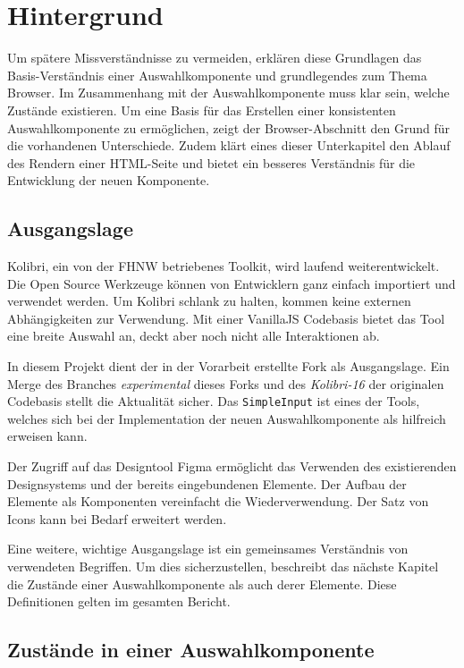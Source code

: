 \chapter{Hintergrund}
\label{chap:background}

Um spätere Missverständnisse zu vermeiden, erklären diese Grundlagen das Basis-Verständnis einer Auswahlkomponente und grundlegendes zum Thema Browser.
Im Zusammenhang mit der Auswahlkomponente muss klar sein, welche Zustände existieren.
Um eine Basis für das Erstellen einer konsistenten Auswahlkomponente zu ermöglichen, zeigt der Browser-Abschnitt den Grund für die vorhandenen Unterschiede.
Zudem klärt eines dieser Unterkapitel den Ablauf des Rendern einer HTML-Seite und bietet ein besseres Verständnis für die Entwicklung der neuen Komponente.


\section{Ausgangslage}
\label{sec:basics}

Kolibri, ein von der FHNW betriebenes Toolkit, wird laufend weiterentwickelt.
Die Open Source Werkzeuge können von Entwicklern ganz einfach importiert und verwendet werden.
Um Kolibri schlank zu halten, kommen keine externen Abhängigkeiten zur Verwendung.
Mit einer VanillaJS Codebasis bietet das Tool eine breite Auswahl an, deckt aber noch nicht alle Interaktionen ab.

In diesem Projekt dient der in der Vorarbeit erstellte Fork als Ausgangslage.
Ein Merge des Branches \emph{experimental} dieses Forks und des \emph{Kolibri-16} der originalen Codebasis stellt die Aktualität sicher.
Das \texttt{SimpleInput} ist eines der Tools, welches sich bei der Implementation der neuen Auswahlkomponente als hilfreich erweisen kann.

Der Zugriff auf das Designtool Figma ermöglicht das Verwenden des existierenden Designsystems und der bereits eingebundenen Elemente. 
Der Aufbau der Elemente als Komponenten vereinfacht die Wiederverwendung. 
Der Satz von Icons kann bei Bedarf erweitert werden.

Eine weitere, wichtige Ausgangslage ist ein gemeinsames Verständnis von verwendeten Begriffen. 
Um dies sicherzustellen, beschreibt das nächste Kapitel die Zustände einer Auswahlkomponente als auch derer Elemente.
Diese Definitionen gelten im gesamten Bericht.


\section{Zustände in einer Auswahlkomponente}
\label{sec:states}


